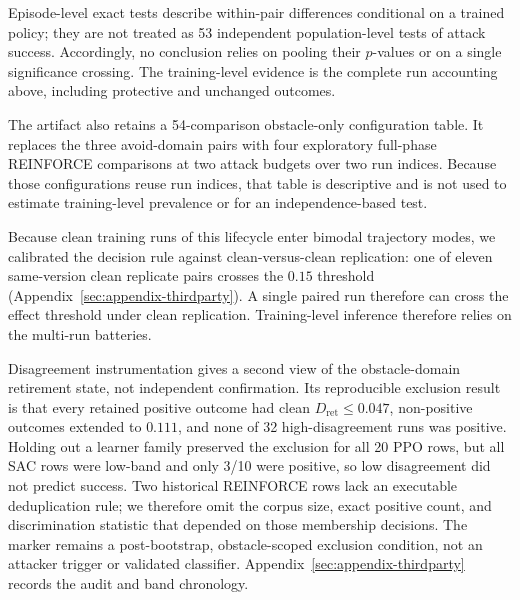 Episode-level exact tests describe within-pair differences conditional on a
trained policy; they are not treated as 53 independent population-level tests
of attack success.  Accordingly, no conclusion relies on pooling their
$p$-values or on a single significance crossing.  The training-level evidence
is the complete run accounting above, including protective and unchanged
outcomes.

The artifact also retains a 54-comparison obstacle-only configuration table.
It replaces the three avoid-domain pairs with four exploratory full-phase
REINFORCE comparisons at two attack budgets over two run indices.  Because
those configurations reuse run indices, that table is descriptive and is not
used to estimate training-level prevalence or for an independence-based test.

Because clean training runs of this lifecycle enter bimodal trajectory modes,
we calibrated the decision rule against clean-versus-clean replication: one of
eleven same-version clean replicate pairs crosses the $0.15$ threshold
(Appendix~\ref{sec:appendix-thirdparty}).  A single paired run therefore
can cross the effect threshold under clean replication.  Training-level
inference therefore relies on the multi-run batteries.

Disagreement instrumentation gives a second view of the obstacle-domain
retirement state, not independent confirmation.  Its reproducible exclusion
result is that every
retained positive outcome had clean $D_{\mathrm{ret}}\le0.047$, non-positive
outcomes extended to $0.111$, and none of 32 high-disagreement runs was
positive.  Holding out a learner family preserved the exclusion for all 20 PPO
rows, but all SAC rows were low-band and only 3/10 were positive, so low
disagreement did not predict success.  Two historical REINFORCE rows lack an
executable deduplication rule; we therefore omit the corpus size, exact positive
count, and discrimination statistic that depended on those membership
decisions.  The marker remains
a post-bootstrap, obstacle-scoped exclusion condition, not an attacker trigger
or validated classifier.  Appendix~\ref{sec:appendix-thirdparty} records the
audit and band chronology.
